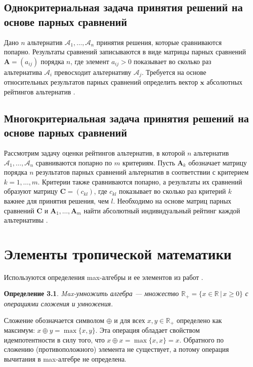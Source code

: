 \documentclass[specialist, substylefile = spbureport.rtx,
    subf,href,colorlinks=true, 12pt]{disser}
\newtheorem*{definition}{Определение}
\begin{document}
    \section{Однокритериальная задача принятия решений на основе парных сравнений}
        Дано $n$ альтернатив $\mathcal{A}_{1},\ldots,\mathcal{A}_{n}$ принятия решения, которые сравниваются попарно. Результаты сравнений записываются в виде матрицы парных сравнений $\bm{A}=(a_{ij})$ порядка $n$, где элемент $a_{ij}>0$ показывает во сколько раз альтернатива $\mathcal{A}_{i}$ превосходит альтернативу $\mathcal{A}_{j}$. Требуется на основе относительных результатов парных сравнений определить вектор $\bm{x}$ абсолютных рейтингов альтернатив \cite{Krivulin2020Reshenie}.

    \section{Многокритериальная задача принятия решений на основе парных сравнений}
        Рассмотрим задачу оценки рейтингов альтернатив, в которой $n$ альтернатив $\mathcal{A}_{1},\ldots,\mathcal{A}_{n}$ сравниваются попарно по $m$ критериям. Пусть $\bm{A}_{k}$ обозначает матрицу порядка $n$ результатов парных сравнений альтернатив в соответствии с критерием $k=1,\ldots,m$. Критерии также сравниваются попарно, а результаты их сравнений образуют матрицу $\bm{C}=(c_{kl})$, где $c_{kl}$ показывает во сколько раз критерий $k$ важнее для принятия решения, чем $l$. Необходимо на основе матриц парных сравнений $\bm{C}$ и $\bm{A}_{1},\ldots,\bm{A}_{m}$ найти абсолютный индивидуальный рейтинг каждой альтернативы \cite{Krivulin2020Reshenie}.


    \chapter{Элементы тропической математики}

    Используются определения max-алгебры и ее элементов из работ \cite{Krivulin2020Reshenie, Krivulin2019Metody}.

    \begin{definition}
        Max-умножить алгебра --- множество $\mathbb{R}_+ = \{x \in \mathbb{R} \, |\, x \geq 0\}$ с операциями сложения и умножения.
    \end{definition}

        Сложение обозначается символом $\oplus$ и для всех $x,y\in\mathbb{R}_{+}$ определено как максимум: $x\oplus y=\max\{x,y\}$. Эта операция обладает свойством идемпотентности в силу того, что ${x\oplus x=\max\{x,x\}=x}$. Обратного по сложению (противоположного) элемента не существует, а потому операция вычитания в max-алгебре не определена.
\end{document}
